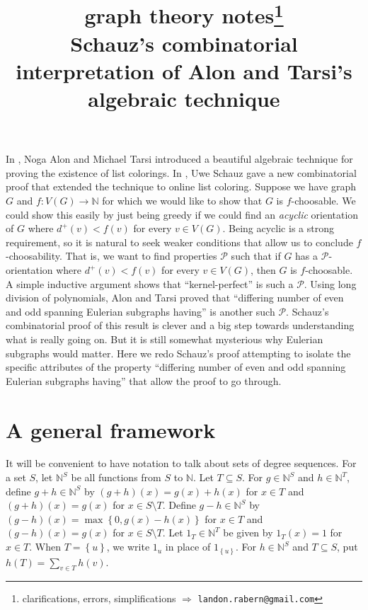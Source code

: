 \documentclass[12pt]{article}
\title{graph theory notes\thanks{clarifications, errors, simplifications $\Rightarrow$ \texttt{landon.rabern@gmail.com}}\\ \bigskip
Schauz's combinatorial interpretation of Alon and Tarsi's algebraic technique}
\date{}
\theoremstyle{plain}
\theoremstyle{definition}
\theoremstyle{remark}
\newcommand{\fancy}[1]{\mathcal{#1}}
\newcommand{\IN}{\mathbb{N}}
\newcommand{\set}[1]{\left\{ #1 \right\}}
\newcommand{\func}[3]{#1\colon #2 \rightarrow #3}
\def\P{\fancy{P}}
\begin{document}
\maketitle

In \cite{Alon1992125}, Noga Alon and Michael Tarsi introduced a beautiful algebraic technique for proving the existence of list colorings.  In \cite{schauz2010flexible}, Uwe Schauz gave a new combinatorial proof that extended the technique to online list coloring.  Suppose we have graph $G$ and $\func{f}{V(G)}{\IN}$ for which we would like to show that $G$ is $f$-choosable.  We could show this easily by just being greedy if we could find an \emph{acyclic} orientation of $G$ where $d^+(v) < f(v)$ for every $v \in V(G)$.  Being acyclic is a strong requirement, so it is natural to seek weaker conditions that allow us to conclude $f$-choosability.  That is, we want to find properties $\P$ such that if $G$ has a $\P$-orientation where $d^+(v) < f(v)$ for every $v \in V(G)$, then $G$ is $f$-choosable.  A simple inductive argument shows that ``kernel-perfect'' is such a $\P$.  Using long division of polynomials, Alon and Tarsi proved that ``differing number of even and odd spanning Eulerian subgraphs having'' is another such $\P$.  Schauz's combinatorial proof of this result is clever and a big step towards understanding what is really going on. But it is still somewhat mysterious why Eulerian subgraphs would matter.  Here we redo Schauz's proof attempting to isolate the specific attributes of the property ``differing number of even and odd spanning Eulerian subgraphs having'' that allow the proof to go through.

\section{A general framework}
It will be convenient to have notation to talk about sets of degree sequences. For a set $S$, let $\IN^S$ be all functions from $S$ to $\IN$.  Let $T \subseteq S$. For $g\in \IN^S$ and $h \in \IN^T$, define $g+h \in \IN^S$ by $(g+h)(x) = g(x) + h(x)$ for $x \in T$ and $(g+h)(x) = g(x)$ for $x \in S\setminus T$. Define $g-h \in \IN^S$ by $(g-h)(x) = \max\set{0, g(x) - h(x)}$ for $x \in T$ and $(g-h)(x) = g(x)$ for $x \in S\setminus T$.  Let $1_T \in \IN^T$ be given by $1_T(x) = 1$ for $x \in T$.  When $T = \set{u}$, we write $1_u$ in place of $1_{\set{u}}$.  For $h \in \IN^S$ and $T \subseteq S$, put $h(T) = \sum_{v \in T} h(v)$.
\end{document}
